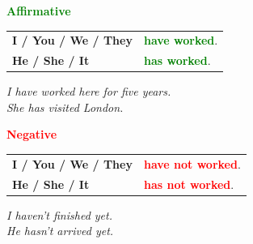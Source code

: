 \documentclass[a4paper,10pt]{article}
\newcommand{\sectiontitle}[2]{%
  {\large\bfseries\textcolor{#1}{#2}}%
}
\begin{document}
\begin{minipage}[t]{.485\textwidth}
\begin{greenbox}
  \sectiontitle{Green}{Affirmative}

  \vspace{0.75mm}
  \begin{tabular}{@{}>{\bfseries}l l@{}}
    I / You / We / They & \textcolor{Green}{\bfseries have worked}.\\
    He / She / It & \textcolor{Green}{\bfseries has worked}.
  \end{tabular}

  \vspace{0.75mm}
  \textit{I have worked here for five years.}\\[-1mm]
  \textit{She has visited London.}
\end{greenbox}
\end{minipage}
\hfill
\begin{minipage}[t]{.485\textwidth}
\begin{redbox}
  \sectiontitle{Red}{Negative}

  \vspace{0.75mm}
  \begin{tabular}{@{}>{\bfseries}l l@{}}
    I / You / We / They & \textcolor{Red}{\bfseries have not worked}.\\
    He / She / It & \textcolor{Red}{\bfseries has not worked}.
  \end{tabular}

  \vspace{0.75mm}
  \textit{I haven't finished yet.}\\[-1mm]
  \textit{He hasn't arrived yet.}
\end{redbox}
\end{minipage}

\vspace{1.35mm}
\end{document}
